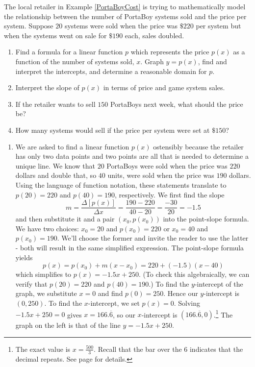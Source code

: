 \documentclass{ximera}
\begin{document}
 \begin{example}\label{PortaBoyDemand}  The local retailer in Example \ref{PortaBoyCost} is trying to mathematically model the relationship between the number of PortaBoy systems sold  and the price per system.  Suppose $20$ systems were sold when the price was  $\$220$ per system but when the systems went on sale for  $\$190$ each, sales doubled.
 
\begin{enumerate}

\item Find a formula for a linear function $p$ which represents the price $p(x)$ as a function of the number of systems sold, $x$. Graph $y = p(x)$, find and interpret the intercepts, and determine a reasonable domain for $p$.

\item Interpret the slope of $p(x)$ in terms of price and game system sales.

\item  If the retailer wants to sell $150$ PortaBoys next week, what should the price be?

\item How many systems would sell if the price per system were set at $\$150$?

\end{enumerate}



\begin{explanation}

\begin{enumerate}

\item  We are asked to find a linear function $p(x)$ ostensibly because the retailer has only two data points and two points are all that is needed to determine a unique line.  We know that $20$ PortaBoys were sold  when the price was $220$ dollars and double that, so $40$ units, were sold when the price was $190$ dollars. Using the language of function notation, these statements translate to  $p(20)=220$ and $p(40)=190$, respectively.  We first find the slope \[ m = \frac{\Delta [p(x)]}{\Delta x} = \frac{190 - 220}{40 - 20} = \frac{-30}{20} = -1.5\] and then substitute it and a pair $(x_0, p(x_0))$ into the point-slope formula.  We have two choices:  $x_0 = 20$ and $p(x_0) = 220$ or $x_0 = 40$ and $p(x_0) = 190$.  We'll choose the former and invite the reader to use the latter - both will result in the same simplified expression.  The point-slope formula yields  \[p(x) = p(x_0) + m (x - x_0) = 220 + (-1.5)(x - 40)\] which simplifies to $p(x) = -1.5x + 250$.  (To check this algebraically, we can verify that $p(20) = 220$ and $p(40) = 190$.) To find the $y$-intercept of the graph, we substitute $x = 0$ and find $p(0) = 250$.  Hence our $y$-intercept is $(0, 250)$.  To find the $x$-intercept, we set $p(x) = 0$. Solving $-1.5x + 250 = 0$ gives $x = 166.\overline{6}$, so our $x$-intercept is $(166.\overline{6}, 0)$.\footnote{The exact value is $x = \frac{500}{3}$. Recall that the bar over the $6$ indicates that the decimal repeats.  See page \pageref{repeatingdecimalnote} for details.} The graph on the left is that of the line $y = -1.5x + 250$.  



\end{enumerate}
\end{explanation}
\end{example}
\end{document}
